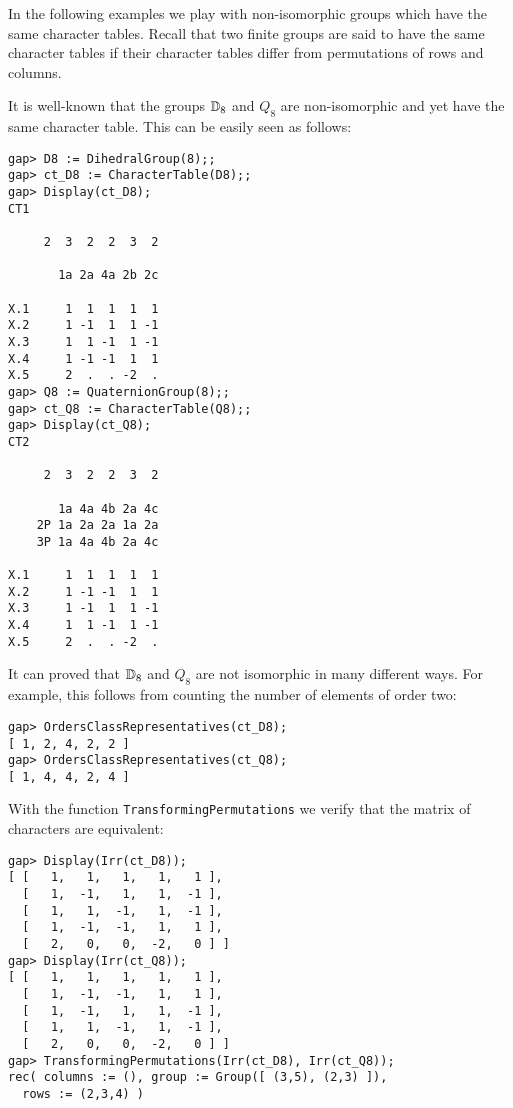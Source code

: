 In the following examples we play with non-isomorphic groups which have the same character tables.
Recall that two finite groups are said to have the same character tables if their character tables differ from permutations of rows and columns.

\begin{example}
    It is well-known that the groups $\mathbb{D}_{8}$ and $Q_8$ 
    are non-isomorphic and yet have the same character table. 
    This can be easily seen as follows:
\begin{lstlisting}
gap> D8 := DihedralGroup(8);;
gap> ct_D8 := CharacterTable(D8);;
gap> Display(ct_D8);
CT1

     2  3  2  2  3  2

       1a 2a 4a 2b 2c

X.1     1  1  1  1  1
X.2     1 -1  1  1 -1
X.3     1  1 -1  1 -1
X.4     1 -1 -1  1  1
X.5     2  .  . -2  .
gap> Q8 := QuaternionGroup(8);;
gap> ct_Q8 := CharacterTable(Q8);;
gap> Display(ct_Q8);
CT2

     2  3  2  2  3  2

       1a 4a 4b 2a 4c
    2P 1a 2a 2a 1a 2a
    3P 1a 4a 4b 2a 4c

X.1     1  1  1  1  1
X.2     1 -1 -1  1  1
X.3     1 -1  1  1 -1
X.4     1  1 -1  1 -1
X.5     2  .  . -2  .
\end{lstlisting}
It can proved that $\mathbb{D}_{8}$ and $Q_8$ are not isomorphic in many different ways.
For example, this follows from counting the number of elements of order two:
\begin{lstlisting}
gap> OrdersClassRepresentatives(ct_D8);
[ 1, 2, 4, 2, 2 ]
gap> OrdersClassRepresentatives(ct_Q8);
[ 1, 4, 4, 2, 4 ]
\end{lstlisting}
With the function \lstinline{TransformingPermutations} 
we verify that 
the matrix of characters 
are equivalent: 
\begin{lstlisting}
gap> Display(Irr(ct_D8));
[ [   1,   1,   1,   1,   1 ],
  [   1,  -1,   1,   1,  -1 ],
  [   1,   1,  -1,   1,  -1 ],
  [   1,  -1,  -1,   1,   1 ],
  [   2,   0,   0,  -2,   0 ] ]
gap> Display(Irr(ct_Q8));
[ [   1,   1,   1,   1,   1 ],
  [   1,  -1,  -1,   1,   1 ],
  [   1,  -1,   1,   1,  -1 ],
  [   1,   1,  -1,   1,  -1 ],
  [   2,   0,   0,  -2,   0 ] ]
gap> TransformingPermutations(Irr(ct_D8), Irr(ct_Q8));
rec( columns := (), group := Group([ (3,5), (2,3) ]),
  rows := (2,3,4) )
\end{lstlisting}
\end{example}

